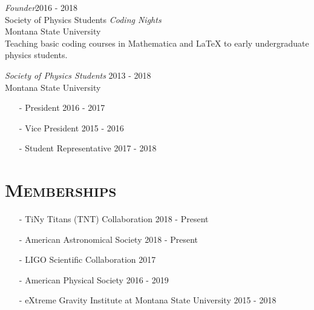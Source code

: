 \documentclass[margin]{res}
\begin{document}
\begin{resume}
{\sl Founder}\hfill 2016 - 2018\\
Society of Physics Students \emph{Coding Nights}\\
Montana State University\\
{\footnotesize Teaching basic coding courses in Mathematica and LaTeX to early undergraduate physics students.}

{\sl Society of Physics Students}  \hfill 2013 - 2018\\
Montana State University
\begin{itemize}
\item[-] President \hfill 2016 - 2017
\item[-]Vice President \hfill 2015 - 2016
\item[-]Student Representative \hfill 2017 - 2018
\end{itemize}


 \bigskip



\section{\textsc{Memberships}} 
\begin{itemize}
\item[-] TiNy Titans (TNT) Collaboration \hfill 2018 - Present
\item[-] American Astronomical Society \hfill 2018 - Present
\item[-] LIGO Scientific Collaboration \hfill 2017
\item[-] American Physical Society \hfill 2016 - 2019
\item[-] eXtreme Gravity Institute at Montana State University \hfill 2015 - 2018
\end{itemize}
 \bigskip
 
%
%

\end{resume}
\end{document}
